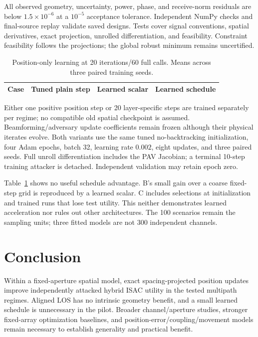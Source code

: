 \documentclass[10pt,journal,onecolumn,draftclsnofoot]{IEEEtran}
\begin{document}
All observed geometry, uncertainty, power, phase, and receive-norm residuals are below $1.5\times10^{-6}$ at a $10^{-5}$ acceptance tolerance. Independent NumPy checks and final-source replay validate saved designs. Tests cover signal conventions, spatial derivatives, exact projection, unrolled differentiation, and feasibility. Constraint feasibility follows the projections; the global robust minimum remains uncertified.

\begin{table}[t]
\caption{Position-only learning at 20 iterations/60 full calls. Means across three paired training seeds.}
\label{tab:learn}\centering\footnotesize
\begin{tabular}{cccc}\toprule
Case & Tuned plain step & Learned scalar & Learned schedule\\\midrule

\end{tabular}
\end{table}
Either one positive position step or 20 layer-specific steps are trained separately per regime; no compatible old spatial checkpoint is assumed. Beamforming/adversary update coefficients remain frozen although their physical iterates evolve. Both variants use the same tuned no-backtracking initialization, four Adam epochs, batch 32, learning rate $0.002$, eight updates, and three paired seeds. Full unroll differentiation includes the PAV Jacobian; a terminal 10-step training attacker is detached. Independent validation may retain epoch zero.

Table~\ref{tab:learn} shows no useful schedule advantage. B's small gain over a coarse fixed-step grid is reproduced by a learned scalar. C includes selections at initialization and trained runs that lose test utility. This neither demonstrates learned acceleration nor rules out other architectures. The 100 scenarios remain the sampling units; three fitted models are not 300 independent channels.

\ifdefined\SingleColumn\else\balance\fi
\section{Conclusion}
Within a fixed-aperture spatial model, exact spacing-projected position updates improve independently attacked hybrid ISAC utility in the tested multipath regimes. Aligned LOS has no intrinsic geometry benefit, and a small learned schedule is unnecessary in the pilot. Broader channel/aperture studies, stronger fixed-array optimization baselines, and position-error/coupling/movement models remain necessary to establish generality and practical benefit.
\end{document}
